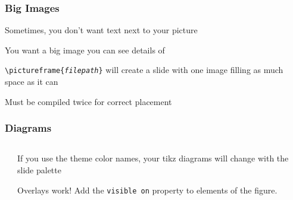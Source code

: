 \documentclass[aspectratio=169,handout]{beamer}
\begin{document}
\begin{frame}
	\frametitle{Big Images}
	\begin{witem}
		\item Sometimes, you don't want text next to your picture
		\item You want a big image you can see details of
		\item \texttt{\textbackslash{}pictureframe\{\textit{filepath}\}} will create
			a slide with one image filling as much space as it can
		\item Must be compiled twice for correct placement
	\end{witem}
\end{frame}








\begin{frame}
	\frametitle{Diagrams}
	\begin{columns}[T] %
    \begin{column}{.58\textwidth}
    \begin{center}
    \resizebox{0.9\textwidth}{!}{

	
	}
    \end{center}
    \end{column}
	\hfill%
	\begin{column}{.48\textwidth}
		\begin{witem}
		\item If you use the theme color names, your tikz diagrams will change with the
			slide palette
		\item Overlays work! Add the \texttt{visible on} property to elements of the figure.
	\end{witem}
	\end{column}%
	\end{columns}
\end{frame}
\end{document}
